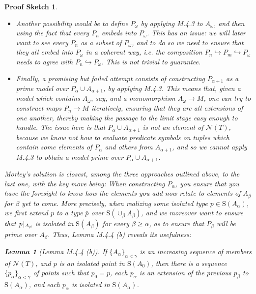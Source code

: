 \documentclass{article}
\newtheorem{lemma}[theorem]{Lemma}
\theoremstyle{nonumberplain}
\newtheorem{sketch}{Proof Sketch}
\newcommand{\calN}{\mathcal{N}}
\newcommand{\Stone}{\mathrm{S}}
\newcommand{\rst}[2]{#1\mspace{1.3mu plus 0.5mu minus 0.5mu}|_{#2}}
\begin{document}
\begin{sketch}
\begin{itemize}
\item Another possibility would be to define $P_\omega$ by applying M.4.3 to $A_\omega$, and then using the fact that every $P_n$ embeds into $P_\omega$. This has an issue: we will later want to see every $P_n$ as a subset of $P_\omega$, and to do so we need to ensure that they all embed into $P_\omega$ in a coherent way, i.e. the composition $P_n \hookrightarrow P_m \hookrightarrow P_\omega$ needs to agree with $P_n \hookrightarrow P_\omega$. This is not trivial to guarantee.

\item Finally, a promising but failed attempt consists of constructing $P_{\alpha+1}$ as a prime model over $P_\alpha \cup A_{\alpha+1}$, by applying M.4.3. This means that, given a model which contains $A_\omega$, say, and a monomorphism $A_\omega \to M$, one can try to construct maps $P_n \to M$ iteratively, ensuring that they are all extensions of one another, thereby making the passage to the limit stage easy enough to handle. The issue here is that $P_\alpha \cup A_{\alpha+1}$ is \emph{not} an element of $\calN(T)$, because we know not how to evaluate predicate symbols on tuples which contain some elements of $P_\alpha$ and others from $A_{\alpha+1}$, and so we cannot apply M.4.3 to obtain a model prime over $P_\alpha \cup A_{\alpha+1}$.
\end{itemize}

Morley's solution is closest, among the three approaches outlined above, to the last one, with the key move being: When constructing $P_\alpha$, you ensure that you have the foresight to know how the elements you add now relate to elements of $A_\beta$ for $\beta$ yet to come. More precisely, when realizing some isolated type $p \in \Stone(A_\alpha)$, we first extend $p$ to a type $\bar p$ over $\Stone(\cup_\beta A_\beta)$, and we moreover want to ensure that $\rst{\bar p}{A_\beta}$ is isolated in $\Stone(A_\beta)$ for every $\beta \geq \alpha$, as to ensure that $P_\beta$ will be prime over $A_\beta$. Thus, Lemma M.4.4 (b) reveals its usefulness:

\begin{lemma}[Lemma M.4.4 (b)]
If $\{A_\alpha\}_{\alpha < \gamma}$ is an increasing sequence of members of $\calN(T)$, and $p$ is an isolated point in $\Stone(A_0)$, then there is a sequence $\{p_\alpha\}_{\alpha<\gamma}$ of points such that $p_0 = p$, each $p_\alpha$ is an extension of the previous $p_\beta$ to $\Stone(A_\alpha)$, and each $p_\alpha$ is isolated in $\Stone(A_\alpha)$.
\end{lemma}


\end{sketch}
\end{document}

